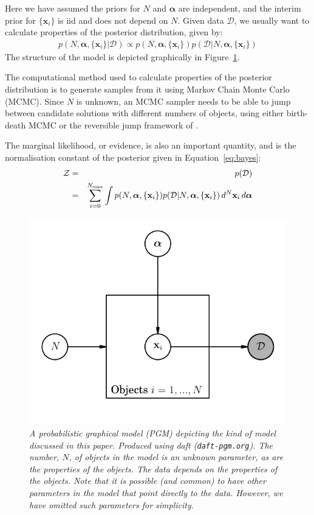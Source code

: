 \documentclass[letterpaper, 11pt]{article}
\newcommand{\hyperparams}{\boldsymbol{\alpha}}
\newcommand{\xx}{\mathbf{x}}
\begin{document}
Here we have assumed the priors for $N$ and $\hyperparams$ are independent, and
the interim prior for $\{\xx_i\}$ is iid and does not depend on $N$.
Given data $\mathcal{D}$, we usually want to calculate properties of the
posterior distribution, given by:
\begin{eqnarray}
p(N, \hyperparams, \{\xx_i\} | \mathcal{D}) \propto
p(N, \hyperparams, \{\xx_i\})
p(\mathcal{D} | N, \hyperparams, \{\xx_i\})\label{eq:bayes}
\end{eqnarray}
The structure of the model is depicted graphically in Figure~\ref{fig:pgm}.

The computational method used to calculate properties of the posterior distribution
is to generate samples from it using Markov Chain Monte Carlo (MCMC). Since
$N$ is unknown, an MCMC sampler needs to be able to jump between candidate
solutions with different numbers of objects, using either birth-death MCMC
\citep{birthdeath} or the reversible jump framework of \citet{rjmcmc}.

The marginal likelihood, or evidence, is also an important quantity, and is
the normalisation constant of the posterior given in Equation~\ref{eq:bayes}:
\begin{eqnarray}
\mathcal{Z} &=& p(\mathcal{D})\\
&=& \sum_{i=0}^{N_{\rm max}} \int
p(N, \hyperparams, \{\xx_i\})p(\mathcal{D} | N, \hyperparams, \{\xx_i\})
\, d^N \xx_i \, d\hyperparams \label{eq:evidence}
\end{eqnarray}


\begin{figure}
\begin{center}
\includegraphics{pgm.pdf}
\caption{\it A probabilistic graphical model (PGM) depicting the kind
of model discussed in this paper. Produced using daft ({\tt daft-pgm.org}).
The number, $N$, of objects in the model is an unknown parameter, as are the
properties of the objects. The data depends on the properties of the objects.
Note that it is possible (and common) to have other parameters in the model
that point directly to the data. However, we have omitted such parameters
for simplicity.
\label{fig:pgm}}
\end{center}
\end{figure}
\end{document}
